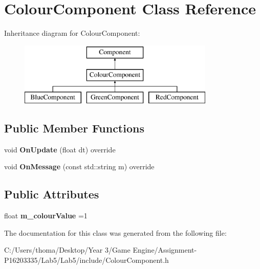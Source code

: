 \hypertarget{class_colour_component}{}\section{Colour\+Component Class Reference}
\label{class_colour_component}
Inheritance diagram for Colour\+Component\+:\begin{figure}[H]
\begin{center}
\leavevmode
\includegraphics[height=3.000000cm]{class_colour_component}
\end{center}
\end{figure}
\subsection*{Public Member Functions}
\begin{DoxyCompactItemize}
\item 
\mbox{\label{class_colour_component_ae45e91aebb680031bb1328c7c189ea15}} 
void {\bfseries On\+Update} (float dt) override
\item 
\mbox{\label{class_colour_component_a40b859f0c124ddbe92ff1e53bdb398a0}} 
void {\bfseries On\+Message} (const std\+::string m) override
\end{DoxyCompactItemize}
\subsection*{Public Attributes}
\begin{DoxyCompactItemize}
\item 
\mbox{\label{class_colour_component_a58d3b68b7fdbf8acc74c043a05371216}} 
float {\bfseries m\+\_\+colour\+Value} =1
\end{DoxyCompactItemize}


The documentation for this class was generated from the following file\+:\begin{DoxyCompactItemize}
\item 
C\+:/\+Users/thoma/\+Desktop/\+Year 3/\+Game Engine/\+Assignment-\/\+P16203335/\+Lab5/\+Lab5/include/Colour\+Component.\+h\end{DoxyCompactItemize}
